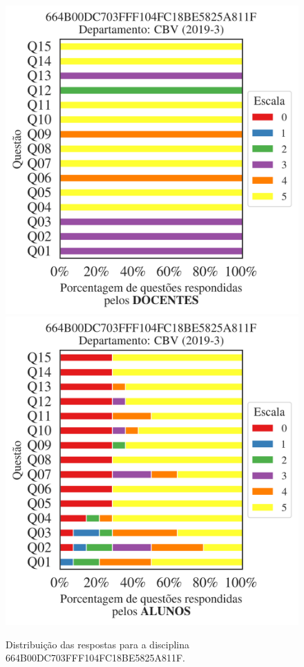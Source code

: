 \documentclass[a4paper,10pt]{article}
\begin{document}
\begin{figure}[h]
\centering
\includegraphics[width=0.485\linewidth]{analise_disciplina_departamento_CBV_664B00DC703FFF104FC18BE5825A811F_docentes.png}
\includegraphics[width=0.485\linewidth]{analise_disciplina_departamento_CBV_664B00DC703FFF104FC18BE5825A811F_alunos.png}
\caption{\label{fig:analise_geral_departamento}                Distribuição das respostas para a disciplina 664B00DC703FFF104FC18BE5825A811F. }
\end{figure}
\end{document}
